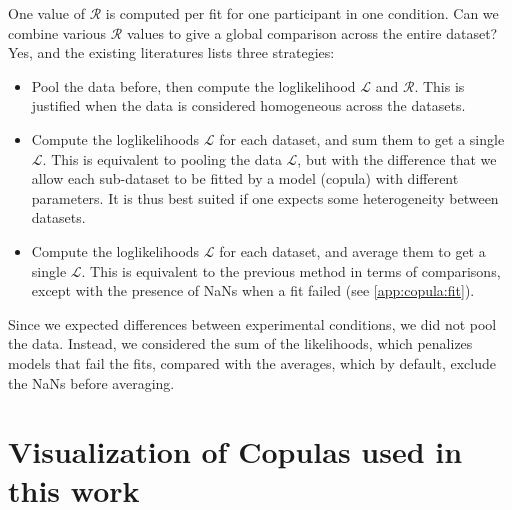 \documentclass[acmlarge, manuscript,review]{acmart}
\begin{document}
One value of $\mathcal{R}$ is computed per fit \eg for one participant in one condition. Can we combine various $\mathcal{R}$ values to give a global comparison across the entire dataset?
Yes, and the existing literatures lists three strategies:
\begin{itemize}
	\item Pool the data before, then compute the loglikelihood $\mathcal{L}$ and $\mathcal{R}$. This is justified when the data is considered homogeneous across the datasets. 
	\item Compute the loglikelihoods $\mathcal{L}$ for each dataset, and sum them to get a single $\mathcal{L}$. This is equivalent to pooling the data $\mathcal{L}$, but with the difference that we allow each sub-dataset to be fitted by a model (copula) with different parameters. It is thus best suited if one expects some heterogeneity between datasets.
	\item Compute the loglikelihoods $\mathcal{L}$ for each dataset, and average them to get a single $\mathcal{L}$. This is equivalent to the previous method in terms of comparisons, except with the presence of NaNs when a fit failed (see \autoref{app:copula:fit}).
\end{itemize}
Since we expected differences between experimental conditions, we did not pool the data. Instead, we considered the sum of the likelihoods, which penalizes models that fail the fits, compared with the averages, which by default, exclude the NaNs before averaging.

\section{Visualization of Copulas used in this work}
\end{document}
